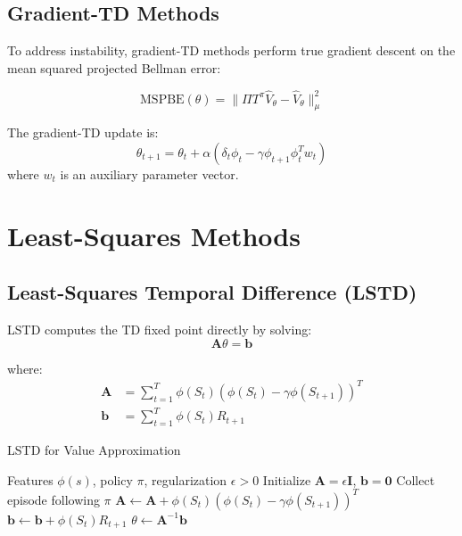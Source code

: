 \subsection{Gradient-TD Methods}

To address instability, gradient-TD methods perform true gradient descent on the mean squared projected Bellman error:

\begin{equation}
\text{MSPBE}(\theta) = \|\Pi T^\pi \hat{V}_\theta - \hat{V}_\theta\|_\mu^2
\end{equation}

The gradient-TD update is:
\begin{equation}
\theta_{t+1} = \theta_t + \alpha (\delta_t \phi_t - \gamma \phi_{t+1} \phi_t^T w_t)
\end{equation}
where $w_t$ is an auxiliary parameter vector.

\section{Least-Squares Methods}

\subsection{Least-Squares Temporal Difference (LSTD)}

LSTD computes the TD fixed point directly by solving:
\begin{equation}
\mathbf{A} \theta = \mathbf{b}
\end{equation}

where:
\begin{align}
\mathbf{A} &= \sum_{t=1}^T \phi(S_t) (\phi(S_t) - \gamma \phi(S_{t+1}))^T \\
\mathbf{b} &= \sum_{t=1}^T \phi(S_t) R_{t+1}
\end{align}

\begin{algorithm}
\caption{LSTD for Value Approximation}
\begin{algorithmic}
\REQUIRE Features $\phi(s)$, policy $\pi$, regularization $\epsilon > 0$
\STATE Initialize $\mathbf{A} = \epsilon \mathbf{I}$, $\mathbf{b} = \mathbf{0}$
\REPEAT
    \STATE Collect episode following $\pi$
        \STATE $\mathbf{A} \leftarrow \mathbf{A} + \phi(S_t)(\phi(S_t) - \gamma \phi(S_{t+1}))^T$
        \STATE $\mathbf{b} \leftarrow \mathbf{b} + \phi(S_t) R_{t+1}$
    \ENDFOR
    \STATE $\theta \leftarrow \mathbf{A}^{-1} \mathbf{b}$
\end{algorithmic}
\end{algorithm}

